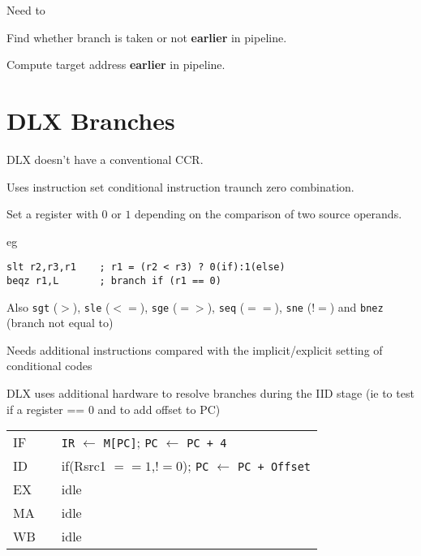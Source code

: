 \documentclass[a4paper,12pt]{article}
\begin{document}
Need to

\indent Find whether branch is taken or not \textbf{earlier} in
pipeline.

\indent Compute target address \textbf{earlier} in pipeline.

\section*{DLX Branches}

DLX doesn't have a conventional CCR.

Uses instruction set conditional instruction traunch zero combination.

Set a register with $0$ or $1$ depending on the comparison of two source
operands.

eg

\begin{verbatim}
slt r2,r3,r1    ; r1 = (r2 < r3) ? 0(if):1(else)
beqz r1,L       ; branch if (r1 == 0)
\end{verbatim}

Also \verb!sgt! ($>$), \verb!sle! ($<=$), \verb!sge! ($=>$), \verb!seq!
($==$), \verb!sne! ($!=$) and \verb!bnez! (branch not equal to)

Needs additional instructions compared with the implicit/explicit
setting of conditional codes

DLX uses additional hardware to resolve branches during the IID stage
(ie to test if a register == $0$ and to add offset to PC)

\begin{tabular}{lll}
IF	&		&	\verb!IR! $\leftarrow$ \verb!M[PC]!; \verb!PC! $\leftarrow$ \verb!PC + 4!\\
ID	&		&	if(Rsrc1 $== 1$,$!=0$); \verb!PC! $\leftarrow$ \verb!PC + Offset! \\
EX	&		&	idle \\
MA	&		&	idle \\
WB	&		&	idle \\
\end{tabular}
\end{document}
